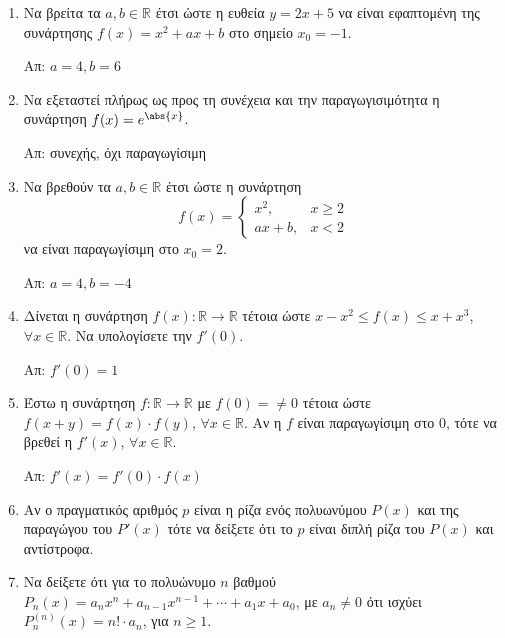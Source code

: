






\begin{center}
\end{center}

\vspace{\baselineskip}

\begin{enumerate}
	\item Να βρείτα τα $ a, b \in \mathbb{R} $ έτσι ώστε η ευθεία $ y = 2x + 5
		$ να είναι εφαπτομένη της συνάρτησης $ f(x) = x^{2} + ax + b $ στο
		σημείο $ x_{0} = -1 $. 

		\hfill Απ: $ a = 4, b = 6 $

	\item Να εξεταστεί πλήρως ως προς τη συνέχεια και την παραγωγισιμότητα η
		συνάρτηση $ f(x) = e^{\abs{x}} $.

		\hfill Απ: συνεχής, όχι παραγωγίσιμη 

	\item Να βρεθούν τα $ a, b \in \mathbb{R} $ έτσι ώστε η συνάρτηση 
		\[
			f(x) = \begin{cases}
				x^{2}, & x\geq 2 \\
				ax+b , & x<2
			\end{cases}
		\]
		να είναι παραγωγίσιμη στο $ x_{0} = 2 $.

		\hfill Απ: $ a=4, b=-4 $

	\item Δίνεται η συνάρτηση $ f(x) \colon \mathbb{R} \to \mathbb{R} $ τέτοια
		ώστε $ x - x^{2} \leq f(x) \leq x + x^{3} $, $ \forall x \in \mathbb{R}
		$. Να υπολογίσετε την $ f'(0) $.

		\hfill Απ: $ f'(0) = 1 $

	\item Έστω η συνάρτηση $ f \colon \mathbb{R} \to \mathbb{R} $ με $ f(0)
		=\neq 0	$ τέτοια ώστε $ f(x+y) = f(x) \cdot f(y) $, $ \forall x \in
		\mathbb{R} $. Αν η $f$ είναι παραγωγίσιμη στο $0$, τότε να βρεθεί η $
		f'(x) $, $ \forall x \in \mathbb{R} $.

		\hfill Απ: $ f'(x) = f'(0)\cdot f(x) $

	\item Αν ο πραγματικός αριθμός $p$ είναι η ρίζα ενός πολυωνύμου $ P(x)
		$ και της παραγώγου του $ P'(x) $ τότε να δείξετε ότι το $p$ είναι διπλή
		ρίζα του $ P(x) $ και αντίστροφα.

	\item Να δείξετε ότι για το πολυώνυμο $n$ βαθμού $ P_{n}(x) =a_{n}x^{n} +
		a_{n-1}x^{n-1} + \cdots + a_{1}x + a_{0} $, με  $ a_{n}\neq 0 $ ότι ισχύει $
		P_{n}^{(n)}(x) = n! \cdot a_{n}$, για  $n\geq 1 $.
\end{enumerate}


